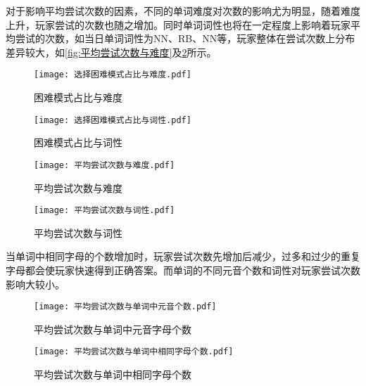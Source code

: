 \documentclass{MathModeling}
\begin{document}
	对于影响平均尝试次数的因素，不同的单词难度对次数的影响尤为明显，随着难度上升，玩家尝试的次数也随之增加。同时单词词性也将在一定程度上影响着玩家平均尝试的次数，如当日单词词性为NN、RB、NN等，玩家整体在尝试次数上分布差异较大，如\textcolor{blue}{\cref{fig:平均尝试次数与难度}}及\textcolor{blue}{\cref{fig:平均尝试次数与词性}}所示。

	\begin{figure}[H]
		\centering
		\begin{minipage}{0.48\linewidth}
			\centering
			\texttt{[image: 选择困难模式占比与难度.pdf]}
			\caption{困难模式占比与难度}
			\label{fig:困难模式占比与难度}
		\end{minipage}
		\begin{minipage}{0.48\linewidth}
			\centering
			\texttt{[image: 选择困难模式占比与词性.pdf]}
			\caption{困难模式占比与词性}
			\label{fig:困难模式占比与词性}
		\end{minipage}
	\end{figure}

	\begin{figure}[H]
		\centering
		\begin{minipage}{0.48\linewidth}
			\centering
			\texttt{[image: 平均尝试次数与难度.pdf]}
			\caption{平均尝试次数与难度}
			\label{fig:平均尝试次数与难度}
		\end{minipage}
		\begin{minipage}{0.48\linewidth}
			\centering
			\texttt{[image: 平均尝试次数与词性.pdf]}
			\caption{平均尝试次数与词性}
			\label{fig:平均尝试次数与词性}
		\end{minipage}
	\end{figure}

	当单词中相同字母的个数增加时，玩家尝试次数先增加后减少，过多和过少的重复字母都会使玩家快速得到正确答案。而单词的不同元音个数和词性对玩家尝试次数影响大较小。

	\begin{figure}[H]
		\centering
		\begin{minipage}{0.48\linewidth}
			\centering
			\texttt{[image: 平均尝试次数与单词中元音个数.pdf]}
			\caption{平均尝试次数与单词中元音字母个数}
			\label{fig:平均尝试次数与单词中元音字母个数}
		\end{minipage}
		\begin{minipage}{0.48\linewidth}
			\centering
			\texttt{[image: 平均尝试次数与单词中相同字母个数.pdf]}
			\caption{平均尝试次数与单词中相同字母个数}
			\label{fig:平均尝试次数与单词中相同字母个数}
		\end{minipage}
	\end{figure}
\end{document}
